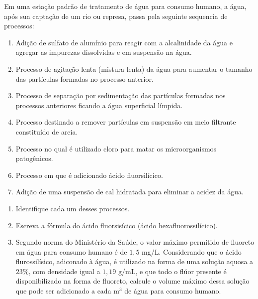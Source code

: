 Em uma estação padrão de tratamento de água para consumo humano, a água, após sua captação de um rio
ou represa, passa pela seguinte sequencia de processos:

\begin{enumerate}[label = (\roman*)]
	\item Adição de sulfato de alumínio para reagir com a alcalinidade da água e agregar as impurezas dissolvidas e em suspensão na água.
	\item Processo de agitação lenta (mistura lenta) da água para aumentar o tamanho das partículas formadas no processo anterior.
	\item Processo de separação por sedimentação das partículas formadas nos processos anteriores ficando a água superficial límpida.
	\item Processo destinado a remover partículas em suspensão em meio filtrante constituído de areia.
	\item Processo no qual é utilizado cloro para matar os microorganismos patogênicos.
	\item Processo em que é adicionado ácido fluorsilícico.
	\item Adição de uma suspensão de cal hidratada para eliminar a acidez da água.
\end{enumerate}

\begin{enumerate}[label = (\alph*)]
	\item Identifique cada um desses processos.
	\item Escreva a fórmula do ácido fluorsisícico (ácido hexafluorossilícico).
	\item Segundo norma do Ministério da Saúde, o valor máximo permitido de fluoreto em água para consumo
humano é de $1,5$ mg/L. Considerando que o ácido flurossilísico, adiconado à água, é utilizado na forma
de uma solução aquosa a $23\%$, com densidade igual a $1,19$ g/mL, e que todo o flúor presente
é disponibilizado na forma de fluoreto, calcule o volume máximo dessa solução que pode ser
adicionado a cada m$^3$ de água para consumo humano.
\end{enumerate}
